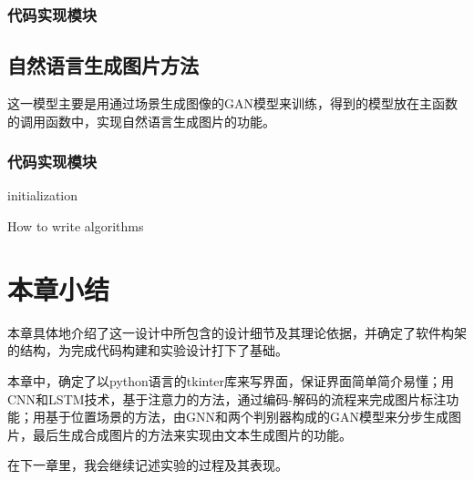 \subsubsection{代码实现模块}


\subsection{自然语言生成图片方法}
这一模型主要是用通过场景生成图像的GAN模型来训练，得到的模型放在主函数的调用函数中，实现自然语言生成图片的功能。


\subsubsection{代码实现模块}

\begin{algorithm}[H]
    \SetAlgoLined
     initialization\;
    \caption{How to write algorithms}
  \end{algorithm}
\section{本章小结}
本章具体地介绍了这一设计中所包含的设计细节及其理论依据，并确定了软件构架的结构，为完成代码构建和实验设计打下了基础。

本章中，确定了以python语言的tkinter库来写界面，保证界面简单简介易懂；用CNN和LSTM技术，基于注意力的方法，通过编码-解码的流程来完成图片标注功能；用基于位置场景的方法，由GNN和两个判别器构成的GAN模型来分步生成图片，最后生成合成图片的方法来实现由文本生成图片的功能。

在下一章里，我会继续记述实验的过程及其表现。



